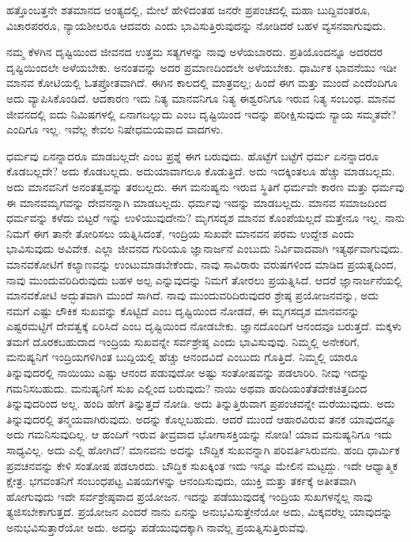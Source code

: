 ಹತ್ತೊಂಬತ್ತನೇ ಶತಮಾನದ ಅಂತ್ಯದಲ್ಲಿ, ಮೇಲೆ ಹೇಳಿದಂತಹ ಜನರೇ ಪ್ರಪಂಚದಲ್ಲಿ ಮಹಾ ಬುದ್ದಿವಂತರೂ, ವಿಚಾರಪರರೂ, ನ್ಯಾಯಶೀಲರೂ ಆದವರು ಎಂದು ಭಾವಿಸುತ್ತಿರುವುದನ್ನು ನೋಡಿದರೆ ಬಹಳ ವ್ಯಸನವಾಗುವುದು.

ನಮ್ಮ ಕೆಳಗಿನ ದೃಷ್ಟಿಯಿಂದ ಜೀವನದ ಉತ್ತಮ ಸತ್ಯಗಳನ್ನು ನಾವು ಅಳೆಯಬಾರದು. ಪ್ರತಿಯೊಂದನ್ನೂ ಅದರದರ ದೃಷ್ಟಿಯಿಂದಲೇ ಅಳೆಯಬೇಕು. ಅನಂತವನ್ನು ಅದರ ಪ್ರಮಾಣದಿಂದಲೇ ಅಳೆಯಬೇಕು. ಧಾರ್ಮಿಕ ಭಾವನೆಯು ಇಡೀ ಮಾನವ ಕೋಟಿಯಲ್ಲಿ ಓತಪ್ರೋತವಾಗಿದೆ. ಈಗಿನ ಕಾಲದಲ್ಲಿ ಮಾತ್ರವಲ್ಲ; ಹಿಂದೆ ಈಗ ಮತ್ತು ಮುಂದೆ ಎಂದೆಂದಿಗೂ ಅದು ವ್ಯಾಪಿಸಿಕೊಂಡಿದೆ. ಆದಕಾರಣ ಇದು ನಿತ್ಯ ಮಾನವನಿಗೂ ನಿತ್ಯ ಈಶ್ವರನಿಗೂ ಇರುವ ನಿತ್ಯ ಸಂಬಂಧ. ಮಾನವ ಜೀವನದಲ್ಲಿ ಐದು ನಿಮಿಷಗಳಲ್ಲಿ ಏನಾಗಬಲ್ಲುದು ಎಂಬ ದೃಷ್ಟಿಯಿಂದ ಇದನ್ನು ಪರೀಕ್ಷಿಸುವುದು ನ್ಯಾಯ ಸಮ್ಮತವೇ? ಎಂದಿಗೂ ಇಲ್ಲ. ಇವೆಲ್ಲ ಕೇವಲ ನಿಷೇಧಮಯವಾದ ವಾದಗಳು.

ಧರ್ಮವು ಏನನ್ನಾದರೂ ಮಾಡಬಲ್ಲದೇ ಎಂಬ ಪ್ರಶ್ನೆ ಈಗ ಬರುವುದು. ಹೊಟ್ಟೆಗೆ ಬಟ್ಟೆಗೆ ಧರ್ಮ ಏನನ್ನಾದರೂ ಕೊಡಬಲ್ಲದೇ? ಅದು ಕೊಡಬಲ್ಲದು. ಅದು\break ಯಾವಾಗಲೂ ಕೊಡುತ್ತಿದೆ. ಅದು ಇದಕ್ಕಿಂತಲೂ ಹೆಚ್ಚು ಮಾಡಬಲ್ಲದು. ಅದು ಮಾನವನಿಗೆ ಅನಂತತ್ವವನ್ನು ತರಬಲ್ಲದು. ಈಗ ಮನುಷ್ಯನು ಇರುವ ಸ್ಥಿತಿಗೆ ಧರ್ಮವೇ ಕಾರಣ ಮತ್ತು ಧರ್ಮವು ಈ ಮಾನವಮೃಗವನ್ನು ದೇವನನ್ನಾಗಿ ಮಾಡಬಲ್ಲದು. ಧರ್ಮವು ಇದನ್ನು ಮಾಡಬಲ್ಲದು. ಮಾನವ ಸಮಾಜದಿಂದ ಧರ್ಮವನ್ನು ಕಳೆದು ಬಿಟ್ಟರೆ ಇನ್ನು ಉಳಿಯುವುದೇನು? ಮೃಗಸದೃಶ ಮಾನವ ಕೊಂಪೆಯಲ್ಲದೆ ಮತ್ತೇನೂ ಇಲ್ಲ. ನಾನು ನಿಮಗೆ ಈಗ ತಾನೇ ತೋರಿಸಲು ಯತ್ನಿಸಿದಂತೆ, ಇಂದ್ರಿಯ ಸುಖವೇ ಮಾನವನ ಪರಮ ಉದ್ದೇಶ ಎಂದು ಭಾವಿಸುವುದು ಅವಿವೇಕ. ಎಲ್ಲಾ ಜೀವನದ ಗುರಿಯೂ ಜ್ಞಾನಾರ್ಜನೆ ಎಂಬುದು ನಿರ್ವಿವಾದವಾಗಿ ಇತ್ಯರ್ಥವಾಗುವುದು. ಮಾನವಕೋಟಿಗೆ ಕಲ್ಯಾಣವನ್ನು ಉಂಟುಮಾಡಬೇಕೆಂದು, ನಾವು ಸಾವಿರಾರು ವರುಷಗಳಿಂದ ಮಾಡಿದ ಪ್ರಯತ್ನದಿಂದ, ನಾವು ಮುಂದುವರಿದಿರುವುದು ಬಹಳ ಅಲ್ಪ ಎನ್ನುವುದನ್ನು ನಿಮಗೆ ತೋರಲು ಪ್ರಯತ್ನಿಸಿದೆ. ಆದರೆ ಜ್ಞಾನಾರ್ಜನೆಯಲ್ಲಿ ಮಾನವಕೋಟಿ ಅದ್ಭುತವಾಗಿ ಮುಂದೆ ಸಾಗಿದೆ. ನಾವು ಮುಂದುವರಿದಿರುವುದರ ಶ್ರೇಷ್ಠ ಪ್ರಯೋಜನವನ್ನು, ಅದು ನಮಗೆ ಎಷ್ಟು ಲೌಕಿಕ ಸುಖವನ್ನು ಕೊಟ್ಟಿದೆ ಎಂಬ ದೃಷ್ಟಿಯಿಂದ ನೋಡದೆ, ಈ ಮೃಗಸದೃಶ ಮಾನವನನ್ನು ಎಷ್ಟರಮಟ್ಟಿಗೆ ದೇವತ್ವಕ್ಕೆ ಏರಿಸಿದೆ ಎಂಬ ದೃಷ್ಟಿಯಿಂದ ನೋಡಬೇಕು. ಜ್ಞಾನದೊಂದಿಗೆ ಆನಂದವೂ ಬರುತ್ತದೆ. ಮಕ್ಕಳು ತಮಗೆ ದೊರಕಬಹುದಾದ ಇಂದ್ರಿಯ ಸುಖವನ್ನೇ ಸರ್ವಶ್ರೇಷ್ಠ ಎಂದು ಭಾವಿಸುವುವು. ನಿಮ್ಮಲ್ಲಿ ಅನೇಕರಿಗೆ, ಮನುಷ್ಯನಿಗೆ ಇಂದ್ರಿಯಗಳಿಗಿಂತ ಬುದ್ದಿಯಲ್ಲಿ ಹೆಚ್ಚು ಆನಂದವಿದೆ ಎಂಬುದು ಗೊತ್ತಿದೆ. ನಿಮ್ಮಲ್ಲಿ ಯಾರೂ ತಿನ್ನುವುದರಲ್ಲಿ ನಾಯಿಯು ಎಷ್ಟು ಆನಂದ ಪಡುವುದೋ ಅಷ್ಟು ಸಂತೋಷವನ್ನು ಪಡಲಾರಿರಿ. ನೀವು ಇದನ್ನು ಗಮನಿಸಬಹುದು. ಮನುಷ್ಯನಿಗೆ ಸುಖ ಎಲ್ಲಿಂದ ಬರುವುದು? ನಾಯಿ ಅಥವಾ ಹಂದಿಯಂತೆ\break ತದೇಕಚಿತ್ತದಿಂದ ತಿನ್ನುವುದರಿಂದ ಅಲ್ಲ. ಹಂದಿ ಹೇಗೆ ತಿನ್ನುತ್ತದೆ ನೋಡಿ. ಅದು ತಿನ್ನುತ್ತಿರುವಾಗ ಪ್ರಪಂಚವನ್ನೇ ಮರೆಯುವುದು. ಅದು ತಿನ್ನುವುದರಲ್ಲಿ ತನ್ಮಯವಾಗಿರುವುದು. ಅದನ್ನು ಕೊಲ್ಲಬಹುದು. ಆದರೆ ಮುಂದೆ ಆಹಾರವಿರುವ ತನಕ ಯಾವುದನ್ನೂ ಅದು ಗಮನಿಸುವುದಿಲ್ಲ. ಆ ಹಂದಿಗೆ ಇರುವ ತೀವ್ರವಾದ ಭೋಗಾಸಕ್ತಿಯನ್ನು ನೋಡಿ! ಯಾವ ಮನುಷ್ಯನಿಗೂ ಇದು ಸಾಧ್ಯವಿಲ್ಲ. ಅದು ಎಲ್ಲಿ ಹೋಗಿದೆ? ಮಾನವನು ಅದನ್ನು ಬೌದ್ದಿಕ ಸುಖವನ್ನಾಗಿ ಪರಿವರ್ತಿಸಿರುವನು. ಹಂದಿ ಧಾರ್ಮಿಕ ಪ್ರವಚನವನ್ನು ಕೇಳಿ ಸಂತೋಷ ಪಡಲಾರದು. ಬೌದ್ಧಿಕ ಸುಖಕ್ಕಿಂತ ಇದು ಇನ್ನೂ ಮೇಲಿನ ಮಟ್ಟದ್ದು. ಇದೇ ಆಧ್ಯಾತ್ಮಿಕ ಕ್ಷೇತ್ರ. ಭಗವಂತನಿಗೆ ಸಂಬಂಧಪಟ್ಟ ವಿಷಯಗಳನ್ನು ಆನಂದಿಸುವುದು, ಯುಕ್ತಿ ಮತ್ತು ತರ್ಕಕ್ಕೆ ಅತೀತವಾಗಿ ಹೋಗುವುದು ಇದೇ ಸರ್ವಶ್ರೇಷ್ಠವಾದ ಪ್ರಯೋಜನ. ಇದನ್ನು ಪಡೆಯುವುದಕ್ಕೆ ಇಂದ್ರಿಯ ಸುಖಗಳನ್ನೆಲ್ಲ ನಾವು ತ್ಯಜಿಸಬೇಕಾಗುತ್ತದೆ. ಪ್ರಯೋಜನ ಎಂದರೆ ನಾನು ಏನನ್ನು ಅನುಭವಿಸುತ್ತೇನೆಯೋ ಅದು, ಮಿಕ್ಕವರೆಲ್ಲ ಯಾವುದನ್ನು ಅನುಭವಿಸುತ್ತಾರೆಯೋ ಅದು. ಅದನ್ನು ಪಡೆಯುವುದಕ್ಕಾಗಿ ನಾವೆಲ್ಲ ಪ್ರಯತ್ನಿಸುತ್ತಿರುವೆವು.

